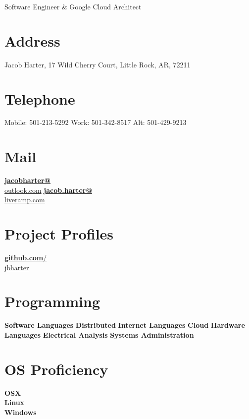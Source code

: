 \documentclass[]{friggeri-cv}
\begin{document}
      {Software Engineer \& Google Cloud Architect}


\begin{aside}
  \section{Address}
    Jacob Harter,
    17 Wild Cherry Court,
    Little Rock, AR, 72211
    ~
  \section{Telephone}
  Mobile: 501-213-5292
  Work: 501-342-8517
  Alt: 501-429-9213
    ~
  \section{Mail}
    \href{mailto:jacobharter@outlook.com}{\textbf{jacobharter@}\\outlook.com}
    \href{mailto:jacob.harter@liveramp.com}{\textbf{jacob.harter@}\\liveramp.com}
    ~
  \section{Project Profiles}
    \href{https://github.com/jbharter}{\textbf{github.com}/\\jbharter}
    ~
  \section{Programming}
        \textbf{Software Languages}
        {}
        \textbf{Distributed}
        {}
        \textbf{Internet Languages}
        {}
        \textbf{Cloud}
        {}
        \textbf{Hardware Languages}
        {}
        \textbf{Electrical Analysis}
        {}
        \textbf{Systems Administration}
        {}
    ~
  \section{OS Proficiency}
    \textbf{OSX}\\ %
    \textbf{Linux}\\  %
    \textbf{Windows}%
    ~
\end{aside}
\end{document}
